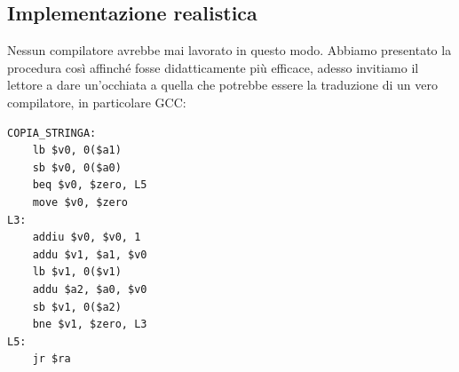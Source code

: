 \documentclass[class=book, crop=false]{standalone}
\begin{document}
\subsection{Implementazione realistica}
Nessun compilatore avrebbe mai lavorato in questo modo. Abbiamo presentato la procedura così affinché fosse didatticamente più efficace, adesso invitiamo il lettore a dare un'occhiata a quella che potrebbe essere la traduzione di un vero compilatore, in particolare GCC:
\begin{verbatim}
COPIA_STRINGA:
	lb $v0, 0($a1)
	sb $v0, 0($a0)
	beq $v0, $zero, L5
	move $v0, $zero
L3:
	addiu $v0, $v0, 1
	addu $v1, $a1, $v0
	lb $v1, 0($v1)
	addu $a2, $a0, $v0
	sb $v1, 0($a2)
	bne $v1, $zero, L3
L5:
	jr $ra
\end{verbatim}
\end{document}
